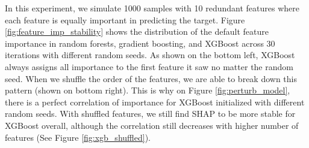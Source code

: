  
In this experiment, we simulate 1000 samples with 10 redundant features where each feature is equally important in predicting the target. Figure \ref{fig:feature_imp_stability} shows the distribution of the default feature importance in random forests, gradient boosting, and XGBoost across 30 iterations with different random seeds. As shown on the bottom left, XGBoost always assigns all importance to the first feature it saw no matter the random seed. When we shuffle the order of the features, we are able to break down this pattern (shown on bottom right). This is why on Figure \ref{fig:perturb_model}, there is a perfect correlation of importance for XGBoost initialized with different random seeds. With shuffled features, we still find SHAP to be more stable for XGBoost overall, although the correlation still decreases with higher number of features (See Figure \ref{fig:xgb_shuffled}).
 
